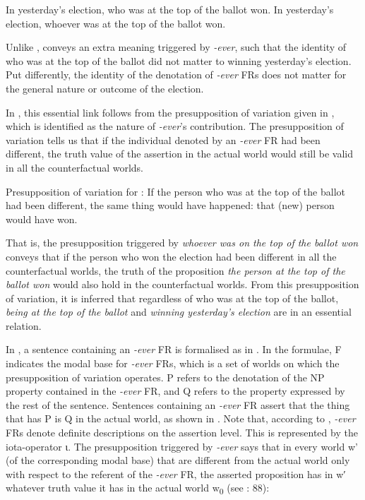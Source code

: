 \largerpage
\ea  %
\ea \label{bkm:Ref533762240} In yesterday’s election, who was at the top of the ballot won.
\ex \label{ex:key:97b} In yesterday’s election, whoever was at the top of the ballot won.
\z
\z\clearpage

Unlike ,  conveys an extra meaning triggered by \textit{-ever}, such that the identity of who was at the top of the ballot did not matter to winning yesterday’s election. Put differently, the identity of the denotation of \textit{-ever} FRs does not matter for the general nature or outcome of the election.

In \citet{Fintel2000}, this essential link follows from the presupposition of variation given in , which is identified as the nature of \textit{-ever}’s contribution. The presupposition of variation tells us that if the individual denoted by an \textit{-ever} FR had been different, the truth value of the assertion in the actual world would still be valid in all the counterfactual worlds.

\ea %
\label{bkm:Ref533762335} Presupposition of variation for : If the person who was at the top of the ballot had been different, the same thing would have happened: that (new) person would have won.
\z

That is, the presupposition triggered by \textit{whoever was on the top of the ballot won} conveys that if the person who won the election had been different in all the counterfactual worlds, the truth of the proposition \textit{the person at the top of the ballot won} would also hold in the counterfactual worlds. From this presupposition of variation, it is inferred that regardless of who was at the top of the ballot, \textit{being at the top of the ballot} and \textit{winning yesterday’s election} are in an essential relation.

In \citet{Fintel2000}, a sentence containing an \textit{-ever} FR is formalised as in . In the formulae, F indicates the modal base for \textit{-ever} FRs, which is a set of worlds on which the presupposition of variation operates. P refers to the denotation of the NP property contained in the \textit{-ever} FR, and Q refers to the property expressed by the rest of the sentence. Sentences containing an \textit{-ever} FR assert that the thing that has P is Q in the actual world, as shown in . Note that, according to \citet{Fintel2000}, \textit{{}-ever} FRs denote definite descriptions on the assertion level. This is represented by the iota-operator ι. The presupposition triggered by \textit{-ever} says that in every world w' (of the corresponding modal base) that are different from the actual world only with respect to the referent of the \textit{-ever} FR, the asserted proposition has in w′ whatever truth value it has in the actual world w\textsubscript{0} (see \citealt{ChoiRomero2008}: 88):

